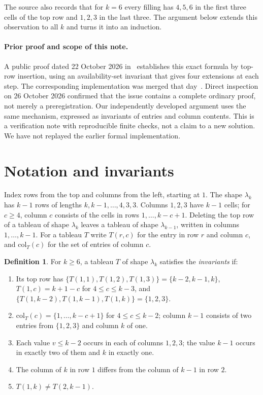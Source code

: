 \documentclass[11pt]{amsart}
\theoremstyle{definition}
\newtheorem{definition}[theorem]{Definition}
\theoremstyle{remark}
\begin{document}
The source also records that for $k=6$ every filling has $4,5,6$ in the first three cells of the top row and $1,2,3$ in the last three. The argument below extends this observation to all $k$ and turns it into an induction.

\paragraph{Prior proof and scope of this note.}
A public proof dated 22 October 2026 in~\cite{PriorLatinProof2026} establishes this exact formula by top-row insertion, using an availability-set invariant that gives four extensions at each step. The corresponding implementation was merged that day~\cite{PriorLatinImplementation2026}. Direct inspection on 26 October 2026 confirmed that the issue contains a complete ordinary proof, not merely a preregistration. Our independently developed argument uses the same mechanism, expressed as invariants of entries and column contents. This is a verification note with reproducible finite checks, not a claim to a new solution. We have not replayed the earlier formal implementation.

\section{Notation and invariants}

Index rows from the top and columns from the left, starting at $1$. The shape $\lambda_k$ has $k-1$ rows of lengths $k,k-1,\dots,4,3,3$. Columns $1,2,3$ have $k-1$ cells; for $c\ge4$, column $c$ consists of the cells in rows $1,\dots,k-c+1$. Deleting the top row of a tableau of shape $\lambda_k$ leaves a tableau of shape $\lambda_{k-1}$, written in columns $1,\dots,k-1$. For a tableau $T$ write $T(r,c)$ for the entry in row $r$ and column $c$, and $\mathrm{col}_T(c)$ for the set of entries of column $c$.

\begin{definition}
For $k\ge6$, a tableau $T$ of shape $\lambda_k$ satisfies the \emph{invariants} if:
\begin{enumerate}
\item[(I1)] Its top row has $\{T(1,1),T(1,2),T(1,3)\}=\{k-2,k-1,k\}$, $T(1,c)=k+1-c$ for $4\le c\le k-3$, and $\{T(1,k-2),T(1,k-1),T(1,k)\}=\{1,2,3\}$.
\item[(I2)] $\mathrm{col}_T(c)=\{1,\dots,k-c+1\}$ for $4\le c\le k-2$; column $k-1$ consists of two entries from $\{1,2,3\}$ and column $k$ of one.
\item[(I3)] Each value $v\le k-2$ occurs in each of columns $1,2,3$; the value $k-1$ occurs in exactly two of them and $k$ in exactly one.
\item[(I4)] The column of $k$ in row $1$ differs from the column of $k-1$ in row $2$.
\item[(I5)] $T(1,k)\ne T(2,k-1)$.
\end{enumerate}
\end{definition}
\end{document}

